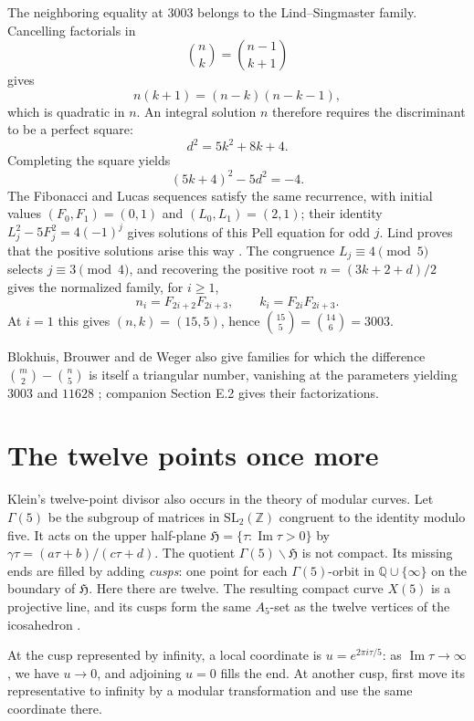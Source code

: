 \documentclass[11pt,a4paper]{article}
\begin{document}
The neighboring equality at $3003$ belongs to the Lind--Singmaster family. Cancelling factorials in
\[
\binom nk=\binom{n-1}{k+1}
\]
gives
\[
n(k+1)=(n-k)(n-k-1),
\]
which is quadratic in $n$. An integral solution $n$ therefore requires the discriminant to be a perfect square:
\[
d^2=5k^2+8k+4.
\]
Completing the square yields
\begin{equation}\label{eq:pell-cut}
(5k+4)^2-5d^2=-4.
\end{equation}
The Fibonacci and Lucas sequences satisfy the same recurrence, with initial values $(F_0,F_1)=(0,1)$ and $(L_0,L_1)=(2,1)$; their identity $L_j^2-5F_j^2=4(-1)^j$ gives solutions of this Pell equation for odd $j$. Lind proves that the positive solutions arise this way \citep[Theorem 7 and Section 5]{Lind1968}. The congruence $L_j\equiv4\pmod5$ selects $j\equiv3\pmod4$, and recovering the positive root $n=(3k+2+d)/2$ gives the normalized family, for $i\geq1$,
\[
n_i=F_{2i+2}F_{2i+3},\qquad k_i=F_{2i}F_{2i+3}.
\]
At $i=1$ this gives $(n,k)=(15,5)$, hence $\binom{15}{5}=\binom{14}{6}=3003$.

Blokhuis, Brouwer and de Weger also give families for which the difference $\binom m2-\binom n5$ is itself a triangular number, vanishing at the parameters yielding $3003$ and $11628$ \citep[Section 3.2]{BlokhuisBrouwerdeWeger2017}; companion Section E.2 gives their factorizations.

\FloatBarrier
\section{The twelve points once more}\label{sec:cusps}

Klein's twelve-point divisor also occurs in the theory of modular curves. Let $\Gamma(5)$ be the subgroup of matrices in $\mathrm{SL}_2(\mathbb Z)$ congruent to the identity modulo five. It acts on the upper half-plane $\mathfrak H=\{\tau:\operatorname{Im}\tau>0\}$ by $\gamma\tau=(a\tau+b)/(c\tau+d)$. The quotient $\Gamma(5)\backslash\mathfrak H$ is not compact. Its missing ends are filled by adding \emph{cusps}: one point for each $\Gamma(5)$-orbit in $\mathbb Q\cup\{\infty\}$ on the boundary of $\mathfrak H$. Here there are twelve. The resulting compact curve $X(5)$ is a projective line, and its cusps form the same $A_5$-set as the twelve vertices of the icosahedron \citep[Sections 3 and 6]{Duke2005}.

At the cusp represented by infinity, a local coordinate is $u=e^{2\pi i\tau/5}$: as $\operatorname{Im}\tau\to\infty$, we have $u\to0$, and adjoining $u=0$ fills the end. At another cusp, first move its representative to infinity by a modular transformation and use the same coordinate there.
\end{document}
